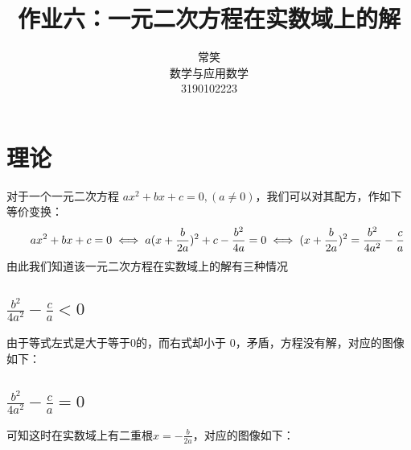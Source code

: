 \documentclass{ctexart}
\title{作业六：一元二次方程在实数域上的解}
\author{常笑 \\ 数学与应用数学 \\ 3190102223 }
\begin{document}
\maketitle

\section{理论}
\indent 对于一个一元二次方程 $ax^2 + bx + c = 0,(a \neq 0) $，我们可以对其配方，作如下等价变换：
\begin{equation}
   \indent ax^2 + bx + c = 0 \\
   \iff a(x + \frac{b}{2a})^2 + c - \frac{b^2}{4a} = 0\\
   \iff (x + \frac{b}{2a})^2  = \frac{b^2}{4a^2} - \frac{c}{a}\\
\end{equation}
\indent 由此我们知道该一元二次方程在实数域上的解有三种情况
\subsection{$\frac{b^2}{4a^2} - \frac{c}{a} < 0$}
\indent 由于等式左式是大于等于$ 0 $的，而右式却小于 $0$，矛盾，方程没有解，对应的图像如下：

\subsection{$\frac{b^2}{4a^2} - \frac{c}{a} = 0$}
\indent 可知这时在实数域上有二重根$x = -\frac{b}{2a}$，对应的图像如下：
\end{document}
